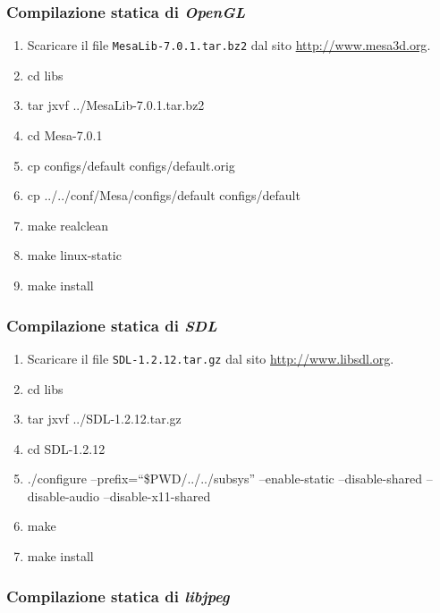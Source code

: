 \subsubsection{Compilazione statica di \emph{OpenGL}} \label{sssec:blender-opengl}

\begin{enumerate}
\item Scaricare il file \texttt{MesaLib-7.0.1.tar.bz2} dal sito \href{http://www.mesa3d.org}{http://www.mesa3d.org}.
\item cd libs
\item tar jxvf ../MesaLib-7.0.1.tar.bz2
\item cd Mesa-7.0.1
\item cp configs/default configs/default.orig
\item cp ../../conf/Mesa/configs/default configs/default
\item make realclean
\item make linux-static
\item make install
\end{enumerate}

\subsubsection{Compilazione statica di \emph{SDL}} \label{sssec:blender-sdl}

\begin{enumerate}
\item Scaricare il file \texttt{SDL-1.2.12.tar.gz} dal sito \href{http://www.libsdl.org}{http://www.libsdl.org}.
\item cd libs
\item tar jxvf ../SDL-1.2.12.tar.gz
\item cd SDL-1.2.12
\item ./configure --prefix=``\$PWD/../../subsys'' --enable-static --disable-shared --disable-audio --disable-x11-shared
\item make
\item make install
\end{enumerate}

\subsubsection{Compilazione statica di \emph{libjpeg}} \label{sssec:blender-jpeg}

